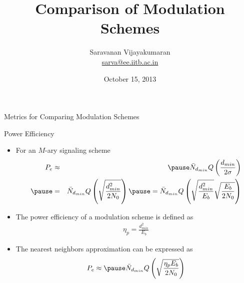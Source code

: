 \documentclass[t]{beamer}
\title[EE 703 DMT]{Comparison of Modulation Schemes}
\author[Saravanan V]
{
  Saravanan Vijayakumaran\\
  \href{mailto:sarva@ee.iitb.ac.in}{sarva@ee.iitb.ac.in}
}
\institute[IIT Bombay]
{
  Department of Electrical Engineering\\
  Indian Institute of Technology Bombay
}
\date{October 15, 2013}
\begin{document}
\begin{frame}
  \titlepage
\end{frame}

\begin{frame}{Metrics for Comparing Modulation Schemes}
  \footnotesize
  \begin{figure}
    \centering
  \end{figure}
  \normalsize
  \end{frame}

\begin{frame}{Power Efficiency}
  \footnotesize
  \begin{itemize}
    \item For an $M$-ary signaling scheme
      \begin{eqnarray*}
        P_e & \approx & \pause \bar{N}_{d_{min}} Q\left(\frac{d_{min}}{2\sigma} \right) \\ \pause 
            & = & \bar{N}_{d_{min}} Q\left(\sqrt{\frac{d_{min}^2}{2N_0}}\right) \pause =  \bar{N}_{d_{min}} Q\left(\sqrt{\frac{d_{min}^2}{E_b}}\sqrt{\frac{E_b}{2N_0}}\right) 
      \end{eqnarray*}
    \item \pause The power efficiency of a modulation scheme is defined as
      \begin{eqnarray*}
        \eta_p = \frac{d_{min}^2}{E_b}
      \end{eqnarray*}
    \item \pause The nearest neighbors approximation can be expressed as
      \begin{eqnarray*}
        P_e  \approx \pause \bar{N}_{d_{min}} Q\left(\sqrt{\frac{\eta_p E_b}{2N_0}}\right) 
      \end{eqnarray*}
  \end{itemize}
  \normalsize
\end{frame}
\end{document}
